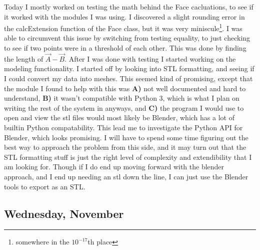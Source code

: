 \documentclass[letterpaper,oneside,titlepage]{article}
\begin{document}
Today I mostly worked on testing the math behind the Face cacluations, to see if it worked with the modules I was using.  I discovered a slight rounding error in the calcExtension function of the Face class, but it was very miniscule\footnote{somewhere in the $10^{-17}$th place}.  I was able to circumvent this issue by switching from testing equality, to just checking to see if two points were in a threshold of each other.  This was done by finding the length of $\vec{A} - \vec{B}$.  After I was done with testing I started working on the modeling functionality.  I started off by looking into STL formatting, and seeing if I could convert my data into meshes.  This seemed kind of promising, except that the module I found to help with this was \textbf{A)} not well documented and hard to understand, \textbf{B)} it wasn't compatible with Python 3, which is what I plan on writing the rest of the system in anyways, and \textbf{C)} the program I would use to open and view the stl files would most likely be Blender, which has a lot of builtin Python compatability.  This lead me to investigate the Python API for Blender, which looks promising.  I will have to spend some time figuring out the best way to approach the problem from this side, and it may turn out that the STL formatting stuff is just the right level of complexity and extendibility that I am looking for.  Though if I do end up moving forward with the blender approach, and I end up needing an stl down the line, I can just use the Blender tools to export as an STL.

\subsection{Wednesday, November }
\end{document}
